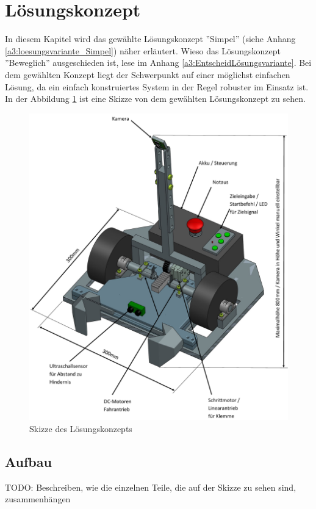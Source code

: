 \documentclass[../main.tex]{subfiles}
\begin{document}
\newpage
\section{Lösungskonzept}

In diesem Kapitel wird das gewählte Lösungskonzept ''Simpel'' (siehe Anhang \ref{a3:loesungsvariante_Simpel}) näher erläutert. Wieso das Lösungskonzept ''Beweglich'' ausgeschieden ist, lese im Anhang \ref{a3:EntscheidLösungsvariante}. Bei dem gewählten Konzept liegt der Schwerpunkt auf einer möglichst einfachen Lösung, da ein einfach konstruiertes System in der Regel robuster im Einsatz ist. In der Abbildung \ref{img:Konzept-Skizze_Fahrzeug} ist eine Skizze von dem gewählten Lösungskonzept zu sehen.

\begin{figure}[H]
\centering
\includegraphics[width=0.85\linewidth]{Skizze Konzept beschriftet.png}
\caption{Skizze des Lösungskonzepts}
\label{img:Konzept-Skizze_Fahrzeug}
\end{figure}

\subsection{Aufbau}

TODO: Beschreiben, wie die einzelnen Teile, die auf der Skizze zu sehen sind, zusammenhängen
\end{document}
